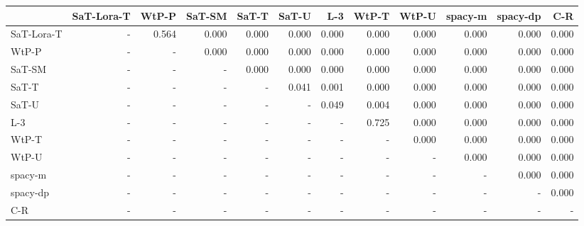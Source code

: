 \begin{tabular}{lrrrrrrrrrrr}
\toprule
 & SaT-Lora-T & WtP-P & SaT-SM & SaT-T & SaT-U & L-3 & WtP-T & WtP-U & spacy-m & spacy-dp & C-R \\
\midrule
SaT-Lora-T & - & 0.564 & 0.000 & 0.000 & 0.000 & 0.000 & 0.000 & 0.000 & 0.000 & 0.000 & 0.000 \\
WtP-P & - & - & 0.000 & 0.000 & 0.000 & 0.000 & 0.000 & 0.000 & 0.000 & 0.000 & 0.000 \\
SaT-SM & - & - & - & 0.000 & 0.000 & 0.000 & 0.000 & 0.000 & 0.000 & 0.000 & 0.000 \\
SaT-T & - & - & - & - & 0.041 & 0.001 & 0.000 & 0.000 & 0.000 & 0.000 & 0.000 \\
SaT-U & - & - & - & - & - & 0.049 & 0.004 & 0.000 & 0.000 & 0.000 & 0.000 \\
L-3 & - & - & - & - & - & - & 0.725 & 0.000 & 0.000 & 0.000 & 0.000 \\
WtP-T & - & - & - & - & - & - & - & 0.000 & 0.000 & 0.000 & 0.000 \\
WtP-U & - & - & - & - & - & - & - & - & 0.000 & 0.000 & 0.000 \\
spacy-m & - & - & - & - & - & - & - & - & - & 0.000 & 0.000 \\
spacy-dp & - & - & - & - & - & - & - & - & - & - & 0.000 \\
C-R & - & - & - & - & - & - & - & - & - & - & - \\
\bottomrule
\end{tabular}

